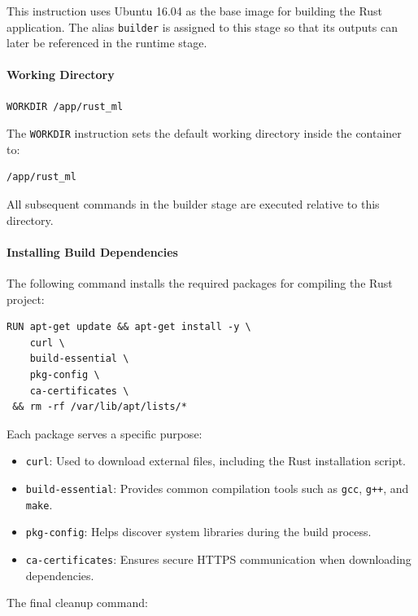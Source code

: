 \documentclass[10pt,a4paper,twocolumn]{article}
\begin{document}
This instruction uses Ubuntu 16.04 as the base image for building the Rust application. The alias \texttt{builder} is assigned to this stage so that its outputs can later be referenced in the runtime stage.

\paragraph{Working Directory}

\begin{verbatim}
WORKDIR /app/rust_ml
\end{verbatim}

The \texttt{WORKDIR} instruction sets the default working directory inside the container to:

\begin{verbatim}
/app/rust_ml
\end{verbatim}

All subsequent commands in the builder stage are executed relative to this directory.

\paragraph{Installing Build Dependencies}

The following command installs the required packages for compiling the Rust project:

\begin{verbatim}
RUN apt-get update && apt-get install -y \
    curl \
    build-essential \
    pkg-config \
    ca-certificates \
 && rm -rf /var/lib/apt/lists/*
\end{verbatim}

Each package serves a specific purpose:

\begin{itemize}
    \item \texttt{curl}: Used to download external files, including the Rust installation script.
    \item \texttt{build-essential}: Provides common compilation tools such as \texttt{gcc}, \texttt{g++}, and \texttt{make}.
    \item \texttt{pkg-config}: Helps discover system libraries during the build process.
    \item \texttt{ca-certificates}: Ensures secure HTTPS communication when downloading dependencies.
\end{itemize}

The final cleanup command:
\end{document}
